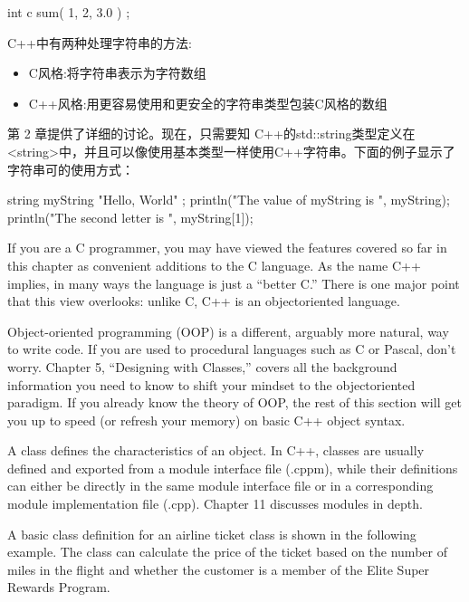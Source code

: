 \begin{cpp}
int c { sum({ 1, 2, 3.0 }) };
\end{cpp}


C++中有两种处理字符串的方法:

\begin{itemize}
\item
C风格:将字符串表示为字符数组

\item
C++风格:用更容易使用和更安全的字符串类型包装C风格的数组
\end{itemize}

第 2 章提供了详细的讨论。现在，只需要知 C++的std::string类型定义在<string>中，并且可以像使用基本类型一样使用C++字符串。下面的例子显示了字符串可的使用方式：

\begin{cpp}
string myString { "Hello, World" };
println("The value of myString is {}", myString);
println("The second letter is {}", myString[1]);
\end{cpp}


If you are a C programmer, you may have viewed the features covered so far in this chapter as convenient additions to the C language. As the name C++ implies, in many ways the language is just a “better C.” There is one major point that this view overlooks: unlike C, C++ is an objectoriented language.

Object-oriented programming (OOP) is a different, arguably more natural, way to write code. If you are used to procedural languages such as C or Pascal, don’t worry. Chapter 5, “Designing with Classes,” covers all the background information you need to know to shift your mindset to the objectoriented paradigm. If you already know the theory of OOP, the rest of this section will get you up to speed (or refresh your memory) on basic C++ object syntax.


A class defines the characteristics of an object. In C++, classes are usually defined and exported from a module interface file (.cppm), while their definitions can either be directly in the same module interface file or in a corresponding module implementation file (.cpp). Chapter 11 discusses modules in depth.

A basic class definition for an airline ticket class is shown in the following example. The class can calculate the price of the ticket based on the number of miles in the flight and whether the customer is a member of the Elite Super Rewards Program.

